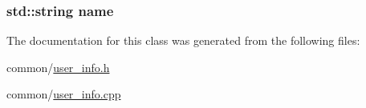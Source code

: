 \subsubsection[{\texorpdfstring{name}{name}}]{\setlength{\rightskip}{0pt plus 5cm}std\+::string name\hspace{0.3cm}{\ttfamily [private]}}\hypertarget{classUserInfo_a9b45b3e13bd9167aab02e17e08916231}{}\label{classUserInfo_a9b45b3e13bd9167aab02e17e08916231}


The documentation for this class was generated from the following files\+:\begin{DoxyCompactItemize}
\item 
common/\hyperlink{user__info_8h}{user\+\_\+info.\+h}\item 
common/\hyperlink{user__info_8cpp}{user\+\_\+info.\+cpp}\end{DoxyCompactItemize}
